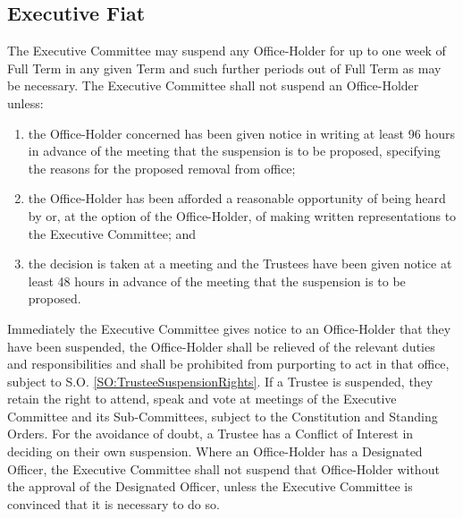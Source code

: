 \subsection{Executive Fiat}
\npara The Executive Committee may suspend any Office-Holder for up to one week of Full Term in any given Term and such further periods out of Full Term as may be necessary.  The Executive Committee shall not suspend an Office-Holder unless:
\begin{enumerate}
	\item the Office-Holder concerned has been given notice in writing at least 96 hours in advance of the meeting that the suspension is to be proposed, specifying the reasons for the proposed removal from office;
	\item the Office-Holder has been afforded a reasonable opportunity of being heard by or, at the option of the Office-Holder, of making written representations to the Executive Committee; and
	\item the decision is taken at a meeting and the Trustees have been given notice at least 48 hours in advance of the meeting that the suspension is to be proposed.
\end{enumerate}
\npara Immediately the Executive Committee gives notice to an Office-Holder that they have been suspended, the Office-Holder shall be relieved of the relevant duties and responsibilities and shall be prohibited from purporting to act in that office, subject to S.O. \ref{SO:TrusteeSuspensionRights}.
\npara \label{SO:TrusteeSuspensionRights} If a Trustee is suspended, they retain the right to attend, speak and vote at meetings of the Executive Committee and its Sub-Committees, subject to the Constitution and Standing Orders.
\npara For the avoidance of doubt, a Trustee has a Conflict of Interest in deciding on their own suspension.
\npara Where an Office-Holder has a Designated Officer, the Executive Committee shall not suspend that Office-Holder without the approval of the Designated Officer, unless the Executive Committee is convinced that it is necessary to do so.
